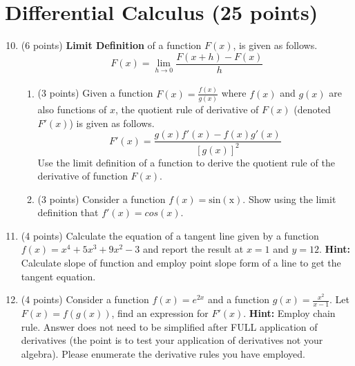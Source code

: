 \documentclass{article}%
\begin{document}
\section*{Differential Calculus (25 points)}
\begin{enumerate}
    \setcounter{enumi}{9}
    \item (6 points) \textbf{Limit Definition} of a function $F(x)$, is given as follows.
    \begin{equation*}
        F(x) = \lim\limits_{h\xrightarrow[]{} 0}\frac{F(x+h) - F(x)}{h}
    \end{equation*}
    \begin{enumerate}
    \item (3 points) Given a function $F(x) = \frac{f(x)}{g(x)}$ where $f(x)$ and $g(x)$ are also functions of $x$, the quotient rule of derivative of $F(x)$ (denoted $F'(x)$) is given as follows. 
    \begin{equation*}
        F'(x) = \frac{g(x)f'(x) - f(x)g'(x)}{[g(x)]^2}
    \end{equation*}
    Use the limit definition of a function to derive the quotient rule of the derivative of function $F(x)$.\vspace{2ex}
    \item (3 points) Consider a function $f(x) = \mathrm{sin(x)}$. Show using the limit definition that $f'(x)= cos(x)$.
\end{enumerate}
\item (4 points) Calculate the equation of a tangent line given by a function $f(x) = x^4 + 5x^3+9x^2-3$ and report the result at $x=1$ and $y = 12$. \textbf{Hint:} Calculate slope of function and employ point slope form of a line to get the tangent equation.

\item (4 points) Consider a function $f(x) = e^{2x}$ and a function $g(x) = \frac{x^2}{x-1}$. Let $F(x) = f(g(x))$, find an expression for $F'(x)$. \textbf{Hint:} Employ chain rule. Answer does not need to be simplified after FULL application of derivatives (the point is to test your application of derivatives not your algebra). Please enumerate the derivative rules you have employed.


\end{enumerate}
\end{document}
